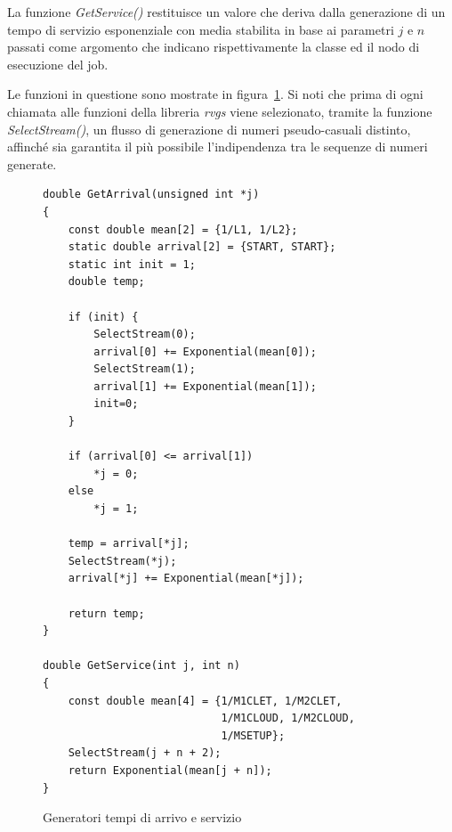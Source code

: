 La funzione \emph{GetService()} restituisce un valore che deriva dalla
generazione di un tempo di servizio esponenziale con media stabilita in base ai
parametri $j$ e $n$ passati come argomento che indicano rispettivamente la
classe ed il nodo di esecuzione del job.

Le funzioni in questione sono mostrate in figura~\ref{code:dgen}. Si noti che
prima di ogni chiamata alle funzioni della libreria \emph{rvgs} viene
selezionato, tramite la funzione \emph{SelectStream()}, un flusso di generazione
di numeri pseudo-casuali distinto, affinché sia garantita il più possibile
l’indipendenza tra le sequenze di numeri generate.  
%
\begin{figure}[!h]
\begin{lstlisting}[title=dgen.c]
double GetArrival(unsigned int *j)
{
    const double mean[2] = {1/L1, 1/L2};
    static double arrival[2] = {START, START};
    static int init = 1;
    double temp;

    if (init) {
        SelectStream(0);
        arrival[0] += Exponential(mean[0]);
        SelectStream(1);
        arrival[1] += Exponential(mean[1]);
        init=0;
    }

    if (arrival[0] <= arrival[1])
        *j = 0;
    else
        *j = 1;

    temp = arrival[*j];
    SelectStream(*j);
    arrival[*j] += Exponential(mean[*j]);
 
    return temp;
}              
             
double GetService(int j, int n)
{                            
    const double mean[4] = {1/M1CLET, 1/M2CLET,
                            1/M1CLOUD, 1/M2CLOUD, 
                            1/MSETUP};
    SelectStream(j + n + 2);               
    return Exponential(mean[j + n]);      
}                                       
\end{lstlisting}
\caption{Generatori tempi di arrivo e servizio}
\label{code:dgen}
\end{figure}
%
%
